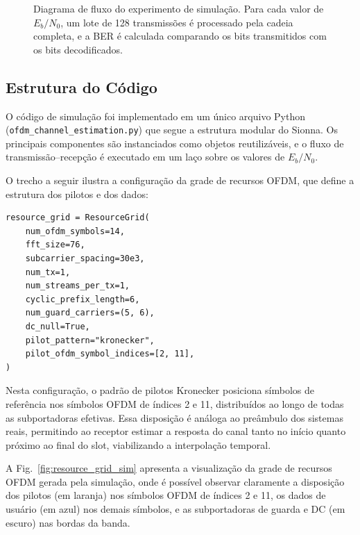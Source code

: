 \documentclass[conference]{IEEEtran}
\begin{document}
\begin{figure}[htbp]
    \caption{Diagrama de fluxo do experimento de simulação. Para cada valor de $E_b/N_0$, um lote de 128 transmissões é processado pela cadeia completa, e a BER é calculada comparando os bits transmitidos com os bits decodificados.}
    \label{fig:experiment_flow}
\end{figure}

\subsection{Estrutura do Código}

O código de simulação foi implementado em um único arquivo Python (\texttt{ofdm\_channel\_estimation.py}) que segue a estrutura modular do Sionna. Os principais componentes são instanciados como objetos reutilizáveis, e o fluxo de transmissão--recepção é executado em um laço sobre os valores de $E_b/N_0$.

O trecho a seguir ilustra a configuração da grade de recursos OFDM, que define a estrutura dos pilotos e dos dados:

\begin{verbatim}
resource_grid = ResourceGrid(
    num_ofdm_symbols=14,
    fft_size=76,
    subcarrier_spacing=30e3,
    num_tx=1,
    num_streams_per_tx=1,
    cyclic_prefix_length=6,
    num_guard_carriers=(5, 6),
    dc_null=True,
    pilot_pattern="kronecker",
    pilot_ofdm_symbol_indices=[2, 11],
)
\end{verbatim}

Nesta configuração, o padrão de pilotos Kronecker posiciona símbolos de referência nos símbolos OFDM de índices 2 e 11, distribuídos ao longo de todas as subportadoras efetivas. Essa disposição é análoga ao preâmbulo dos sistemas reais, permitindo ao receptor estimar a resposta do canal tanto no início quanto próximo ao final do slot, viabilizando a interpolação temporal.

A Fig.~\ref{fig:resource_grid_sim} apresenta a visualização da grade de recursos OFDM gerada pela simulação, onde é possível observar claramente a disposição dos pilotos (em laranja) nos símbolos OFDM de índices 2 e 11, os dados de usuário (em azul) nos demais símbolos, e as subportadoras de guarda e DC (em escuro) nas bordas da banda.
\end{document}
